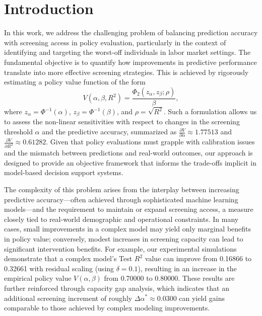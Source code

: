 \documentclass{article} %
\begin{document}
\section{Introduction}
In this work, we address the challenging problem of balancing prediction accuracy with screening access in policy evaluation, particularly in the context of identifying and targeting the worst-off individuals in labor market settings. The fundamental objective is to quantify how improvements in predictive performance translate into more effective screening strategies. This is achieved by rigorously estimating a policy value function of the form 
\[
V(\alpha,\beta,R^2)=\frac{\Phi_2(z_\alpha,z_\beta;\rho)}{\beta},
\]
where \( z_\alpha=\Phi^{-1}(\alpha) \), \( z_\beta=\Phi^{-1}(\beta) \), and \(\rho=\sqrt{R^2}\). Such a formulation allows us to assess the non-linear sensitivities with respect to changes in the screening threshold \(\alpha\) and the predictive accuracy, summarized as \(\frac{\partial V}{\partial \alpha}\approx 1.77513\) and \(\frac{\partial V}{\partial R^2}\approx 0.61282\). Given that policy evaluations must grapple with calibration issues and the mismatch between predictions and real-world outcomes, our approach is designed to provide an objective framework that informs the trade-offs implicit in model-based decision support systems.

The complexity of this problem arises from the interplay between increasing predictive accuracy—often achieved through sophisticated machine learning models—and the requirement to maintain or expand screening access, a measure closely tied to real-world demographic and operational constraints. In many cases, small improvements in a complex model may yield only marginal benefits in policy value; conversely, modest increases in screening capacity can lead to significant intervention benefits. For example, our experimental simulations demonstrate that a complex model’s Test \(R^2\) value can improve from 0.16866 to 0.32661 with residual scaling (using \(\delta=0.1\)), resulting in an increase in the empirical policy value \( V(\alpha,\beta) \) from 0.70000 to 0.80000. These results are further reinforced through capacity gap analysis, which indicates that an additional screening increment of roughly \(\Delta\alpha^* \approx 0.0300\) can yield gains comparable to those achieved by complex modeling improvements.
\end{document}
